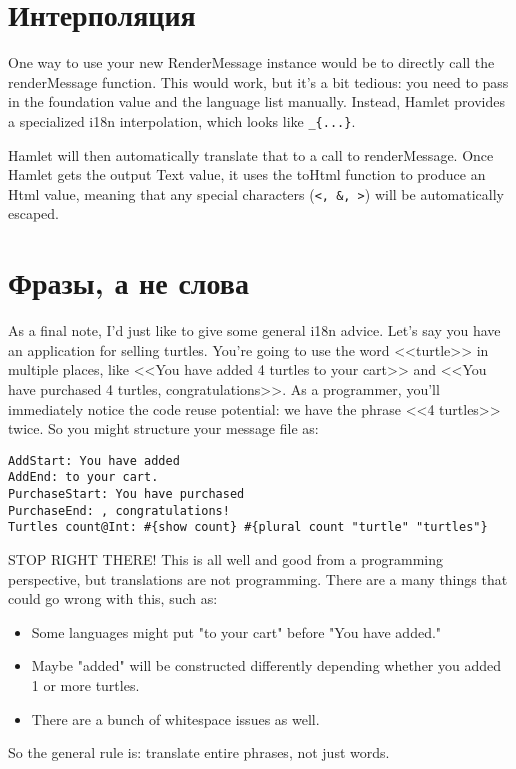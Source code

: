 \section{Интерполяция} %

One way to use your new RenderMessage instance would be to directly call the renderMessage function. This would work, but it's a bit tedious: you need to pass in the foundation value and the language list manually. Instead, Hamlet provides a specialized i18n interpolation, which looks like \lstinline'_{...}'.


Hamlet will then automatically translate that to a call to renderMessage. Once Hamlet gets the output Text value, it uses the toHtml function to produce an Html value, meaning that any special characters (\lstinline'<, &, >') will be automatically escaped.

\section{Фразы, а не слова} %

As a final note, I'd just like to give some general i18n advice. Let's say you have an application for selling turtles. You're going to use the word <<turtle>> in multiple places, like <<You have added 4 turtles to your cart>> and <<You have purchased 4 turtles, congratulations>>. As a programmer, you'll immediately notice the code reuse potential: we have the phrase <<4 turtles>> twice. So you might structure your message file as:

\begin{lstlisting}
AddStart: You have added
AddEnd: to your cart.
PurchaseStart: You have purchased
PurchaseEnd: , congratulations!
Turtles count@Int: #{show count} #{plural count "turtle" "turtles"}
\end{lstlisting}

STOP RIGHT THERE! This is all well and good from a programming perspective, but translations are not programming. There are a many things that could go wrong with this, such as:

\begin{itemize}
  \item Some languages might put "to your cart" before "You have added."
  \item Maybe "added" will be constructed differently depending whether you added 1 or more turtles.
  \item There are a bunch of whitespace issues as well.
\end{itemize}

So the general rule is: translate entire phrases, not just words.

